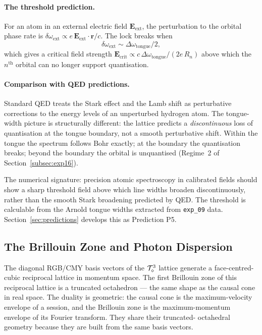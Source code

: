 \paragraph{The threshold prediction.}
For an atom in an external electric field $\mathbf{E}_\text{ext}$,
the perturbation to the orbital phase rate is
$\delta\omega_\text{ext} \propto e\,\mathbf{E}_\text{ext}\cdot\mathbf{r}/c$.
The lock breaks when
\begin{equation}
    \delta\omega_\text{ext} \sim \Delta\omega_\text{tongue}/2,
    \label{eq:stark_threshold}
\end{equation}
which gives a critical field strength
$\mathbf{E}_\text{crit} \propto c\,\Delta\omega_\text{tongue}/(2 e\,R_n)$
above which the $n^\text{th}$ orbital can no longer support
quantisation.

\paragraph{Comparison with QED predictions.}
Standard QED treats the Stark effect and the Lamb shift as
perturbative corrections to the energy levels of an unperturbed
hydrogen atom. The tongue-width picture is structurally different:
the lattice predicts a \emph{discontinuous} loss of quantisation at
the tongue boundary, not a smooth perturbative shift. Within the
tongue the spectrum follows Bohr exactly; at the boundary the
quantisation breaks; beyond the boundary the orbital is
unquantised (Regime~2 of Section~\ref{subsec:exp16}).

The numerical signature: precision atomic spectroscopy in calibrated
fields should show a sharp threshold field above which line widths
broaden discontinuously, rather than the smooth Stark broadening
predicted by QED. The threshold is calculable from the Arnold
tongue widths extracted from \texttt{exp\_09} data.
Section~\ref{sec:predictions} develops this as Prediction P5.

\subsection{The Brillouin Zone and Photon Dispersion}
\label{subsec:brillouin_zone}

The diagonal RGB/CMY basis vectors of the $\mathcal{T}_\diamond^3$ lattice
generate a face-centred-cubic reciprocal lattice in momentum space.
The first Brillouin zone of this reciprocal lattice is a truncated
octahedron --- the same shape as the causal cone in real space. The
duality is geometric: the causal cone is the maximum-velocity
envelope of a session, and the Brillouin zone is the maximum-momentum
envelope of its Fourier transform. They share their truncated-
octahedral geometry because they are built from the same basis
vectors.

